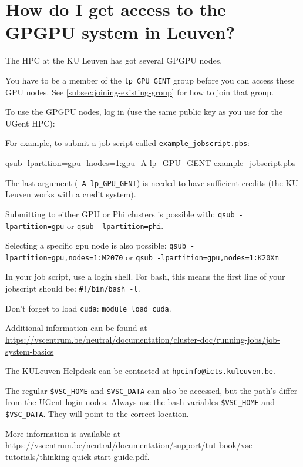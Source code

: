 \ifgent
\section{How do I get access to the GPGPU system in Leuven?}

The HPC at the KU Leuven has got several GPGPU nodes.

You have to be a member of the \lstinline|lp_GPU_GENT| group before you can
access these GPU nodes. See \autoref{subsec:joining-existing-group} for how to join that group.

To use the GPGPU nodes, log in (use the same public key as you use for the UGent HPC):

\begin{prompt}
\end{prompt}

For example, to submit a job script called \lstinline|example_jobscript.pbs|:

\begin{prompt}
qsub -lpartition=gpu -lnodes=1:gpu -A lp_GPU_GENT example_jobscript.pbs
\end{prompt}

The last argument (\lstinline|-A lp_GPU_GENT|) is needed to have sufficient credits
(the KU Leuven works with a credit system).

Submitting to either GPU or Phi clusters is possible with: \lstinline|qsub -lpartition=gpu|
or \lstinline|qsub -lpartition=phi|.

Selecting a specific gpu node is also possible:
\lstinline|qsub -lpartition=gpu,nodes=1:M2070| or \lstinline|qsub -lpartition=gpu,nodes=1:K20Xm|

In your job script, use a login shell. For bash, this means the first line of your jobscript should be:
\lstinline|#!/bin/bash -l|.

Don't forget to load \lstinline|cuda|: \lstinline|module load cuda|.

Additional information can be found at \url{https://vscentrum.be/neutral/documentation/cluster-doc/running-jobs/job-system-basics}

The KULeuven Helpdesk can be contacted at \lstinline|hpcinfo@icts.kuleuven.be|.


The regular \lstinline|$VSC_HOME| and \lstinline|$VSC_DATA| can also be accessed,
but the path's differ from the UGent login nodes. Always use the bash variables \lstinline|$VSC_HOME|
and \lstinline|$VSC_DATA|. They will point to the correct location.

More information is available at \url{https://vscentrum.be/neutral/documentation/support/tut-book/vsc-tutorials/thinking-quick-start-guide.pdf}.
\fi
